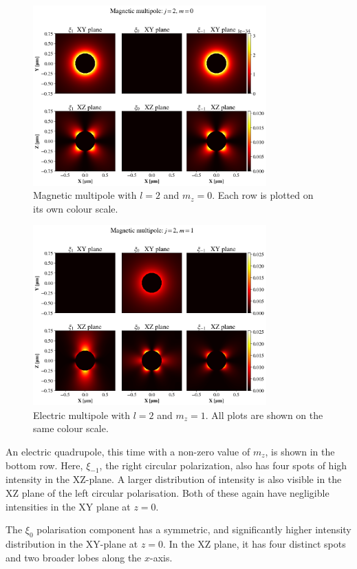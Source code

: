 \begin{figure}
    \includegraphics[trim={0 0cm 0 2cm},clip,width=0.8\textwidth]{Figures/mpolej2m0.png}
    \caption{Magnetic multipole with \( l = 2 \) and \( m_z = 0 \). Each row is plotted on its own colour scale.}
    \label{fig:mpole}
\end{figure}

\begin{figure}
    \includegraphics[trim={0 0cm 0 2cm},clip,width=0.8\textwidth]{Figures/epolej2m1.png}
    \caption{Electric multipole with \( l = 2 \) and \( m_z = 1 \). All plots are shown on the same colour scale.}
    \label{fig:epole}
\end{figure}

An electric quadrupole, this time with a non-zero value of \( m_z \), is shown in the bottom row. Here, \( \xi_{-1} \), the right circular polarization, also has four spots of high intensity in the XZ-plane. A larger distribution of intensity is also visible in the XZ plane of the left circular polarisation. Both of these again have negligible intensities in the XY plane at \( z = 0 \).

The \( \xi_0 \) polarisation component has a symmetric, and significantly higher intensity distribution in the XY-plane at \( z = 0 \). In the XZ plane, it has four distinct spots and two broader lobes along the \( x \)-axis.